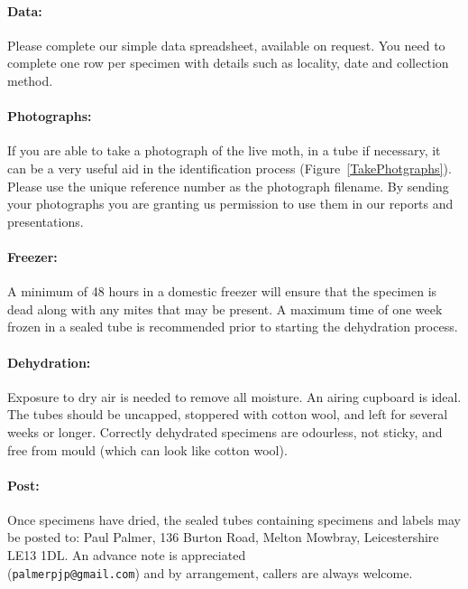 \documentclass[12pt]{article}
\begin{document}
	\paragraph{Data:} Please complete our simple data spreadsheet, available on request. You need to complete one row per specimen with details such as locality, date and collection method. 

	\paragraph{Photographs:} If you are able to take a photograph of the live moth, in a tube if necessary, it can be a very useful aid in the identification process (Figure~\ref{TakePhotgraphs}).  Please use the unique reference number as the photograph filename. By sending your photographs you are granting us permission to use them in our reports and presentations.
	
	\paragraph{Freezer:} A minimum of 48 hours in a domestic freezer will ensure that the specimen is dead along with any mites that may be present. A maximum time of one week frozen in a sealed tube is recommended prior to starting the dehydration process.
	\paragraph{Dehydration:} Exposure to dry air is needed to remove all moisture. An airing cupboard is ideal. The tubes should be uncapped, stoppered with cotton wool, and left for several weeks or longer.  Correctly dehydrated specimens are odourless, not sticky, and free from mould (which can look like cotton wool).
	\paragraph{Post:} Once specimens have dried, the sealed tubes containing specimens and labels may be posted to: Paul Palmer, 136 Burton Road, Melton Mowbray, Leicestershire LE13 1DL. An advance note is appreciated \\ (\texttt{palmerpjp@gmail.com}) and by arrangement, callers are always welcome.
\end{document}
